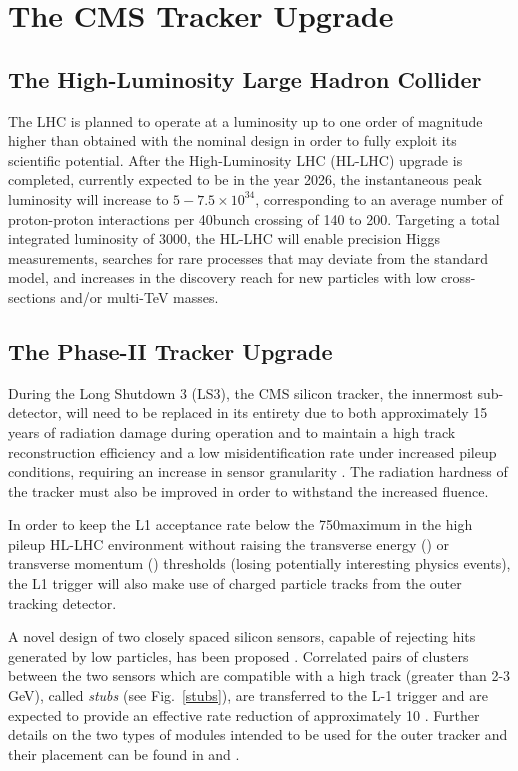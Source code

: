 \section{The CMS Tracker Upgrade}\label{sec:tk-upgrade}
 
\subsection{The High-Luminosity Large Hadron Collider} 
The LHC is planned to operate at a luminosity up to one order of magnitude higher than obtained with the nominal design in order to fully exploit its scientific potential.
After the High-Luminosity LHC (HL-LHC) upgrade \cite{hl-lhc-prelim-design-report} is completed, currently expected to be in the year 2026, the instantaneous peak luminosity will increase to $5-7.5 \times {10}^{34}$\percms, corresponding to an average number of proton-proton interactions per 40\MHz bunch crossing of 140 to 200.
Targeting a total integrated luminosity of $3000$\fbinv, the HL-LHC will enable precision Higgs measurements, searches for rare processes that may deviate from the standard model, and increases in the discovery reach for new particles with low cross-sections and/or multi-TeV masses.


\subsection{The Phase-II Tracker Upgrade}

During the Long Shutdown 3 (LS3), the CMS silicon tracker, the innermost sub-detector, will need to be replaced in its entirety due to both approximately 15 years of radiation damage during operation and to maintain a high track reconstruction efficiency and a low misidentification rate under increased pileup conditions, requiring an increase in sensor granularity \cite{P2TrackerTDR}.
The radiation hardness of the tracker must also be improved in order to withstand the increased fluence.

In order to keep the L1 acceptance rate below the 750\kHz maximum in the high pileup HL-LHC environment without raising the transverse energy (\ET) or transverse momentum (\pT) thresholds (losing potentially interesting physics events), the L1 trigger will also make use of charged particle tracks from the outer tracking detector.
 
A novel design of two closely spaced silicon sensors, capable of rejecting hits generated by low \pT particles, has been proposed \cite{jjonespixel,markthesis}. Correlated pairs of clusters between the two sensors which are compatible with a high \pT track (greater than 2-3 GeV), called \textit{stubs} (see Fig.~\ref{stubs}), are transferred to the L-1 trigger and are expected to provide an effective rate reduction of approximately 10 \cite{mpessimperf,2dptmoduleconcept}. Further details on the two types of \pT modules intended to be used for the outer tracker and their placement can be found in \cite{CMS_Upgrade_TP} and \cite{P2TrackerTDR}.

